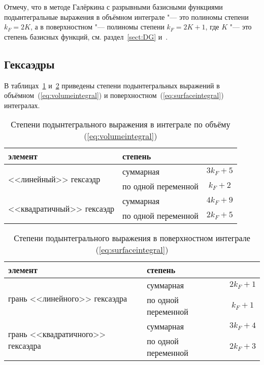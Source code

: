 Отмечу, что в методе Галёркина с разрывными базисными функциями подынтегральные выражения в объёмном интеграле "--- это полиномы степени \(k_F = 2K\), а в поверхностном "--- полиномы степени \(k_F = 2K + 1\), где \(K\) "--- это степень базисных функций, см. раздел~\ref{sect:DG} и~\cite{Podaruev:2017}.



\subsection{Гексаэдры}

В таблицах~\ref{tab:integrationorder:hexa} и~\ref{tab:integrationparam:hexa} приведены степени подынтегральных выражений в объёмном~(\ref{eq:volumeintegral}) и поверхностном~(\ref{eq:surfaceintegral}) интегралах.

\begin{table}[h]
	\centering
	\caption{Степени подынтегрального выражения в интеграле по объёму (\ref{eq:volumeintegral})}
	\label{tab:integrationorder:hexa}
	\smallskip
	\begin{tabular}{l l c}
		\toprule
		элемент                                    & степень             & \\
		\midrule
		\multirow{2}{*}{<<линейный>> гексаэдр}     & суммарная           & \(3k_F + 5\) \\
		                                           & по одной переменной & \( k_F + 2\) \\
		\midrule
		\multirow{2}{*}{<<квадратичный>> гексаэдр} & суммарная           & \(4k_F + 9\) \\
		                                           & по одной переменной & \(2k_F + 5\) \\
		\bottomrule
	\end{tabular}
\end{table}

\begin{table}[h]
	\centering
	\caption{Степени подынтегрального выражения в поверхностном интеграле (\ref{eq:surfaceintegral})}
	\label{tab:integrationparam:hexa}
	\smallskip
	\begin{tabular}{l l c}
		\toprule
		элемент                                            & степень             & \\
		\midrule
		\multirow{2}{*}{грань <<линейного>> гексаэдра}     & суммарная           & \(2k_F + 1\) \\
		                                                   & по одной переменной & \( k_F + 1\) \\
		\midrule
		\multirow{2}{*}{грань <<квадратичного>> гексаэдра} & суммарная           & \(3k_F + 4\) \\
		                                                   & по одной переменной & \(2k_F + 3\) \\
		\bottomrule
	\end{tabular}
\end{table}

